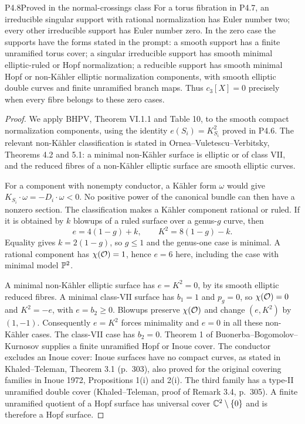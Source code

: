\begin{statement}{P4.8}{Proved in the normal-crossings class}
For a torus fibration in P4.7, an irreducible singular support with
rational normalization has Euler number two; every other irreducible
support has Euler number zero. In the zero case the supports have the
forms stated in the prompt: a smooth support has a finite unramified
torus cover; a singular irreducible support has smooth minimal
elliptic-ruled or Hopf normalization; a reducible support has smooth
minimal Hopf or non-Kähler elliptic normalization components, with
smooth elliptic double curves and finite unramified branch maps.
Thus $c_3[X]=0$ precisely when every fibre belongs to these zero cases.
\end{statement}
\begin{proof}
We apply BHPV, Theorem VI.1.1 and Table 10, to the smooth compact
normalization components, using the identity $e(S_i)=K_{S_i}^2$ proved
in P4.6. The relevant non-Kähler classification is stated in
Ornea--Vuletescu--Verbitsky, Theorems 4.2 and 5.1: a minimal non-Kähler
surface is elliptic or of class VII, and the reduced fibres of a
non-Kähler elliptic surface are smooth elliptic curves.

For a component with nonempty conductor, a Kähler form $\omega$ would
give $K_{S_i}\cdot\omega=-D_i\cdot\omega<0$. No positive power of
the canonical bundle can then have a nonzero section. The classification
makes a Kähler component rational or ruled. If it is obtained by $k$
blowups of a ruled surface over a genus-$g$ curve, then
\[
 e=4(1-g)+k,\qquad K^2=8(1-g)-k.
\]
Equality gives $k=2(1-g)$, so $g\le1$ and the genus-one case is minimal.
A rational component has $\chi(\mathcal O)=1$, hence $e=6$ here, including
the case with minimal model $\mathbb P^2$.

A minimal non-Kähler elliptic surface has $e=K^2=0$, by its smooth
elliptic reduced fibres. A minimal class-VII surface has $b_1=1$ and
$p_g=0$, so $\chi(\mathcal O)=0$ and $K^2=-e$, with $e=b_2\ge0$.
Blowups preserve $\chi(\mathcal O)$ and change $(e,K^2)$ by $(1,-1)$.
Consequently $e=K^2$ forces minimality and $e=0$ in all these
non-Kähler cases. The class-VII case has $b_2=0$. Theorem 1 of
Buonerba--Bogomolov--Kurnosov supplies a finite unramified Hopf or
Inoue cover. The conductor excludes an Inoue cover: Inoue surfaces
have no compact curves, as stated in Khaled--Teleman, Theorem 3.1
(p.~303), also proved for the original covering families in Inoue
1972, Propositions 1(i) and 2(i). The third family has a type-II
unramified double cover (Khaled--Teleman, proof of Remark 3.4,
p.~305). A finite unramified quotient of a Hopf surface has universal
cover $\mathbb C^2\setminus\{0\}$ and is therefore a Hopf surface.


\end{proof}
